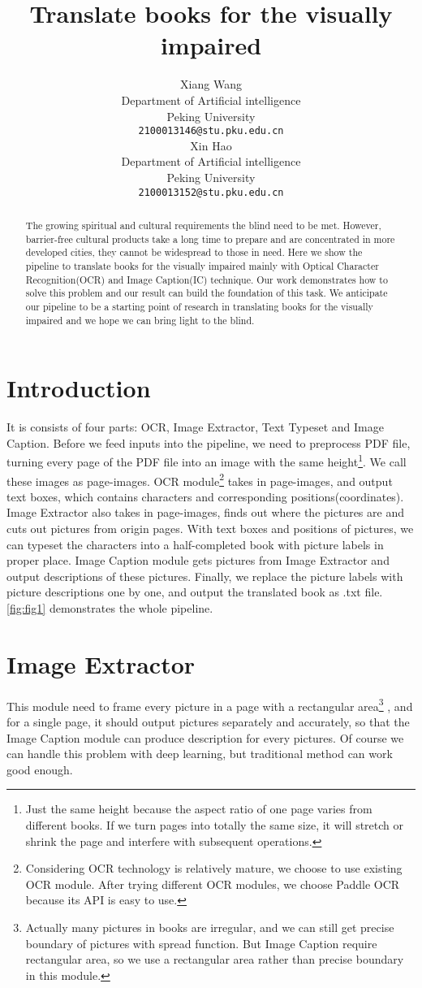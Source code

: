 \documentclass{article}
\title{Translate books for the visually impaired}
\author{
  Xiang Wang\\
  Department of Artificial intelligence\\
  Peking University\\
  \texttt{2100013146@stu.pku.edu.cn} \\
  \And
  Xin Hao \\
  Department of Artificial intelligence\\
  Peking University\\
  \texttt{2100013152@stu.pku.edu.cn} \\
}
\begin{document}
\maketitle

\begin{abstract}
  The growing spiritual and cultural requirements the blind need to be met. 
  However, barrier-free cultural products take a long time to prepare and are concentrated in more developed cities, they cannot be widespread to those in need. 
  Here we show the pipeline to translate books for the visually impaired mainly with Optical Character Recognition(OCR) and Image Caption(IC) technique. 
  Our work demonstrates how to solve this problem and our result can build the foundation of this task. 
  We anticipate our pipeline to be a starting point of research in translating books for the visually impaired and we hope we can bring light to the blind. 
\end{abstract}

\section{Introduction}
It is consists of four parts: OCR, Image Extractor, Text Typeset and Image Caption. 
Before we feed inputs into the pipeline, we need to preprocess PDF file, turning every page of the PDF file into an image with the same height\footnote{
Just the same height because the aspect ratio of one page varies from different books. If we turn pages into totally the same size, it will stretch or shrink the page and interfere with subsequent operations.
}. We call these images as page-images.
OCR module\footnote{
Considering OCR technology is relatively mature, we choose to use existing OCR module. After trying different OCR modules, we choose Paddle OCR because its API is easy to use.
} takes in page-images, and output text boxes, which contains characters and corresponding positions(coordinates). 
Image Extractor also takes in page-images, finds out where the pictures are and cuts out pictures from origin pages. 
With text boxes and positions of pictures, we can typeset the characters into a half-completed book with picture labels in proper place. 
Image Caption module gets pictures from Image Extractor and output descriptions of these pictures. 
Finally, we replace the picture labels with picture descriptions one by one, and output the translated book as .txt file.
\cref{fig:fig1} demonstrates the whole pipeline.

\section{Image Extractor}
This module need to frame every picture in a page with a rectangular area\footnote{
Actually many pictures in books are irregular, and we can still get precise boundary of pictures with spread function. But Image Caption require rectangular area, so we use a rectangular area rather than precise boundary in this module.
} , 
and for a single page, it should output pictures separately and accurately, so that the Image Caption module can produce description for every pictures. 
Of course we can handle this problem with deep learning, but traditional method can work good enough. 
\end{document}
